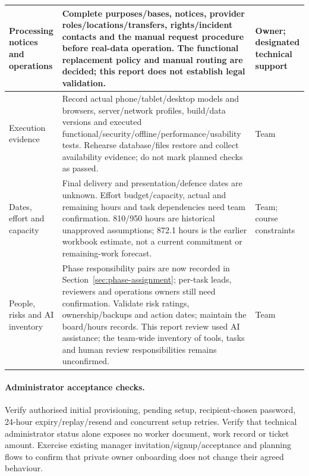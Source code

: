 {\begin{longtable}{L{0.24}L{0.53}L{0.23}}
\midrule
{}\label{decision:Q-NFR-03}Processing notices and operations & Complete purposes/bases, notices, provider roles/locations/transfers, rights/incident contacts and the manual request procedure before real-data operation. The functional replacement policy and manual routing are decided; this report does not establish legal validation. & Owner; designated technical support \\
\midrule
{}\label{decision:Q-VERIFY-01}Execution evidence & Record actual phone/tablet/desktop models and browsers, server/network profiles, build/data versions and executed functional/security/offline/performance/usability tests. Rehearse database/files restore and collect availability evidence; do not mark planned checks as passed. & Team \\
\midrule
{}\label{decision:Q-PM-01}Dates, effort and capacity & Final delivery and presentation/defence dates are unknown. Effort budget/capacity, actual and remaining hours and task dependencies need team confirmation. 810/950 hours are historical unapproved assumptions; 872.1 hours is the earlier workbook estimate, not a current commitment or remaining-work forecast. & Team; course constraints \\
\midrule
{}\label{decision:Q-PM-02}People, risks and AI inventory & Phase responsibility pairs are now recorded in Section~\ref{sec:phase-assignment}; per-task leads, reviewers and operations owners still need confirmation. Validate risk ratings, ownership/backups and action dates; maintain the board/hours records. This report review used AI assistance; the team-wide inventory of tools, tasks and human review responsibilities remains unconfirmed. & Team \\
\end{longtable}}

\paragraph{Administrator acceptance checks.}
Verify authorised initial provisioning, pending setup, recipient-chosen password,
24-hour expiry/replay/resend and concurrent setup retries. Verify that technical
administrator status alone exposes no worker document, work record or ticket amount.
Exercise existing manager invitation/signup/acceptance and planning flows to confirm
that private owner onboarding does not change their agreed behaviour.
